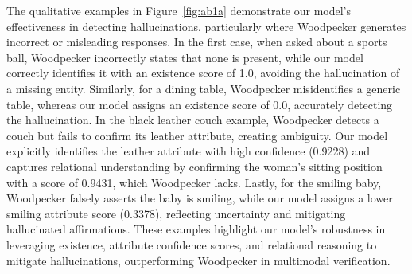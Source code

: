 



The qualitative examples in Figure~\ref{fig:ab1a} demonstrate our model’s effectiveness in detecting hallucinations, particularly where Woodpecker generates incorrect or misleading responses. In the first case, when asked about a sports ball, Woodpecker incorrectly states that none is present, while our model correctly identifies it with an existence score of 1.0, avoiding the hallucination of a missing entity. Similarly, for a dining table, Woodpecker misidentifies a generic table, whereas our model assigns an existence score of 0.0, accurately detecting the hallucination.
In the black leather couch example, Woodpecker detects a couch but fails to confirm its leather attribute, creating ambiguity. Our model explicitly identifies the leather attribute with high confidence (0.9228) and captures relational understanding by confirming the woman’s sitting position with a score of 0.9431, which Woodpecker lacks.
Lastly, for the smiling baby, Woodpecker falsely asserts the baby is smiling, while our model assigns a lower smiling attribute score (0.3378), reflecting uncertainty and mitigating hallucinated affirmations.
These examples highlight our model’s robustness in leveraging existence, attribute confidence scores, and relational reasoning to mitigate hallucinations, outperforming Woodpecker in multimodal verification.

